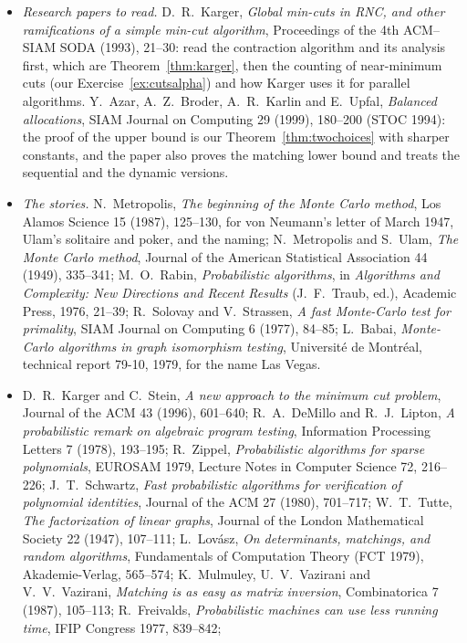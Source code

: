 \begin{itemize}
\item \emph{Research papers to read.} D.~R.~Karger, \emph{Global min-cuts in RNC, and other ramifications of a simple min-cut algorithm}, Proceedings of the 4th ACM--SIAM SODA (1993), 21--30: read the contraction algorithm and its analysis first, which are Theorem~\ref{thm:karger}, then the counting of near-minimum cuts
(our Exercise~\ref{ex:cutsalpha}) and how Karger uses it for parallel algorithms. Y.~Azar, A.~Z.~Broder, A.~R.~Karlin and E.~Upfal, \emph{Balanced allocations}, SIAM Journal on Computing 29 (1999), 180--200 (STOC 1994): the proof of the upper bound is our Theorem~\ref{thm:twochoices} with sharper constants, and the paper also proves the matching lower bound and treats the
sequential and the dynamic versions.
\item \emph{The stories.} N.~Metropolis, \emph{The beginning of the Monte Carlo method}, Los Alamos Science 15 (1987), 125--130, for von Neumann's letter of March 1947, Ulam's solitaire and poker, and the naming; N.~Metropolis and S.~Ulam, \emph{The Monte Carlo method}, Journal of the American Statistical Association 44 (1949), 335--341;
M.~O.~Rabin, \emph{Probabilistic algorithms}, in \emph{Algorithms and Complexity: New Directions and Recent Results} (J.~F.~Traub, ed.), Academic Press, 1976, 21--39; R.~Solovay and V.~Strassen, \emph{A fast Monte-Carlo test for primality}, SIAM Journal on Computing 6 (1977), 84--85;
L.~Babai, \emph{Monte-Carlo algorithms in graph isomorphism testing}, Universit\'e de Montr\'eal, technical report 79-10, 1979, for the name Las Vegas.
\item D.~R.~Karger and C.~Stein, \emph{A new approach to the minimum cut problem}, Journal of the ACM 43 (1996), 601--640; R.~A.~DeMillo and R.~J.~Lipton, \emph{A probabilistic remark on algebraic program testing}, Information Processing Letters 7 (1978), 193--195; R.~Zippel, \emph{Probabilistic algorithms for sparse polynomials}, EUROSAM 1979,
Lecture Notes in Computer Science 72, 216--226; J.~T.~Schwartz, \emph{Fast probabilistic algorithms for verification of polynomial identities}, Journal of the ACM 27 (1980), 701--717; W.~T.~Tutte, \emph{The factorization of linear graphs}, Journal of the London Mathematical Society 22 (1947), 107--111; L.~Lov\'asz, \emph{On determinants, matchings, and random
algorithms}, Fundamentals of Computation Theory (FCT 1979), Akademie-Verlag, 565--574; K.~Mulmuley, U.~V.~Vazirani and V.~V.~Vazirani, \emph{Matching is as easy as matrix inversion}, Combinatorica 7 (1987), 105--113; R.~Freivalds, \emph{Probabilistic machines can use less running time}, IFIP Congress 1977, 839--842;

\end{itemize}
